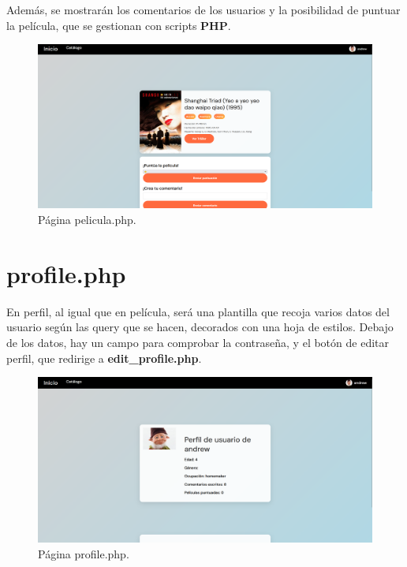 \documentclass[a4paper, 12pt]{report}
\begin{document}
    Además, se mostrarán los comentarios de los usuarios y la posibilidad de puntuar la película, que se gestionan con scripts \textbf{PHP}.

    \begin{figure}[H]
        \centering
        \includegraphics[scale=0.20]{resources/img/movie.png}
        \caption{Página pelicula.php.}
        \label{fig:pelicula}
    \end{figure}
    \section{profile.php}

    En perfil, al igual que en película, será una plantilla que recoja varios datos del usuario según las query que se hacen, decorados con una hoja de estilos. Debajo de los datos, hay un campo para comprobar la contraseña, y el botón de editar perfil, que redirige a \textbf{edit\_profile.php}.

    \begin{figure}[H]
        \centering
        \includegraphics[scale=0.20]{resources/img/profile.png}
        \caption{Página profile.php.}
        \label{fig:profile}
    \end{figure}
\end{document}
